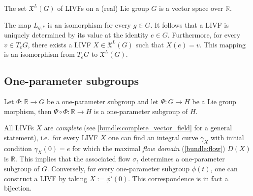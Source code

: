     \begin{property}
        The set $\mathfrak{X}^L(G)$ of LIVFs on a (real) Lie group $G$ is a vector space over $\mathbb{R}$.
    \end{property}
    \begin{property}\label{lie:livf_prop}
        The map $L_{g,\ast}$ is an isomorphism for every $g\in G$. It follows that a LIVF is uniquely determined by its value at the identity $e\in G$. Furthermore, for every $v\in T_eG$, there exists a LIVF $X\in\mathfrak{X}^L(G)$ such that $X(e)=v$. This mapping is an isomorphism from $T_eG$ to $\mathfrak{X}^L(G)$.
    \end{property}

\subsection{One-parameter subgroups}

    \begin{property}\label{lie:OPS_composition}
        Let $\Phi:\mathbb{R}\rightarrow G$ be a one-parameter subgroup and let $\Psi:G\rightarrow H$ be a Lie group morphism, then $\Psi\circ\Phi:\mathbb{R}\rightarrow H$ is a one-parameter subgroup of $H$.
    \end{property}

    \begin{property}\label{lie:livf_subgroup}
        All LIVFs $X$ are \textit{complete} (see \cref{bundle:complete_vector_field} for a general statement), i.e.~for every LIVF $X$ one can find an integral curve $\gamma_X$ with initial condition $\gamma_X(0)=e$ for which the maximal \textit{flow domain} (\cref{bundle:flow}) $D(X)$ is $\mathbb{R}$. This implies that the associated flow $\sigma_t$ determines a one-parameter subgroup of $G$. Conversely, for every one-parameter subgroup $\phi(t)$, one can construct a LIVF by taking $X:=\phi'(0)$. This correspondence is in fact a bijection.
    \end{property}

